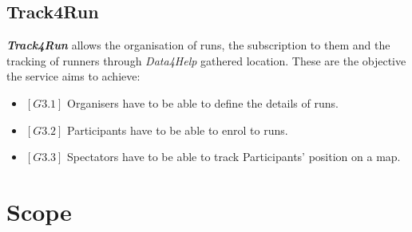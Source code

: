 \subsection{Track4Run}
    \textbf{\emph{Track4Run}} allows the organisation of runs, the subscription to them and the tracking of runners through \emph{Data4Help} gathered location. These are the objective the service aims to achieve:
    \begin{itemize}
        \item $[G3.1]$ Organisers have to be able to define the details of runs.
        \item $[G3.2]$ Participants have to be able to enrol to runs.
        \item $[G3.3]$ Spectators have to be able to track Participants' position on a map.
    \end{itemize}

\section{Scope}
    